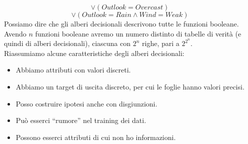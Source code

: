 \[\lor(Outlook=Overcast)\]
\[\lor(Outlook=Rain \land Wind=Weak) \] 
Possiamo dire che gli alberi decisionali descrivono tutte le funzioni
booleane. Avendo $n$ funzioni booleane avremo un numero distinto di tabelle di
verità (e quindi di alberi decisionali), ciascuna con $2^n$ righe, pari a
$2^{2^{n}}$.\\
Riassumiamo alcune caratteristiche degli alberi decisionali:
\begin{itemize}
  \item Abbiamo attributi con valori discreti.
  \item Abbiamo un target di uscita discreto, per cui le foglie hanno valori precisi.
  \item Posso costruire ipotesi anche con disgiunzioni.
  \item Può esserci ``rumore'' nel training dei dati.
  \item Possono esserci attributi di cui non ho informazioni.
\end{itemize}
